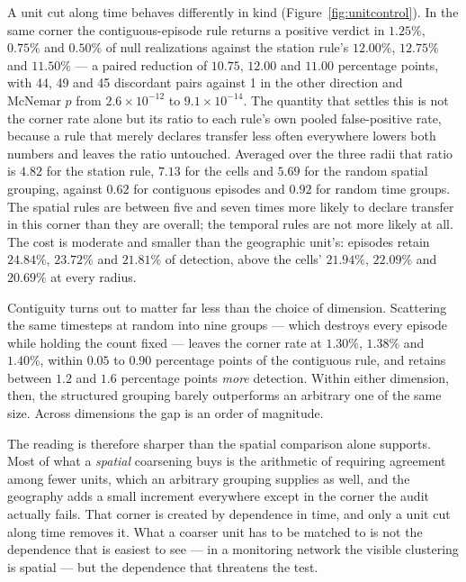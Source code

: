 A unit cut along time behaves differently in kind (Figure~\ref{fig:unitcontrol}). In the same
corner the contiguous-episode rule returns a positive verdict in $1.25\%$, $0.75\%$ and $0.50\%$ of
null realizations against the station rule's $12.00\%$, $12.75\%$ and $11.50\%$ --- a paired
reduction of $10.75$, $12.00$ and $11.00$ percentage points, with 44, 49 and 45 discordant pairs
against 1 in the other direction and McNemar $p$ from $2.6\times10^{-12}$ to $9.1\times10^{-14}$.
The quantity that settles this is not the corner rate alone but its ratio to each rule's own pooled
false-positive rate, because a rule that merely declares transfer less often everywhere lowers both
numbers and leaves the ratio untouched. Averaged over the three radii that ratio is $4.82$ for the
station rule, $7.13$ for the cells and $5.69$ for the random spatial grouping, against $0.62$ for
contiguous episodes and $0.92$ for random time groups. The spatial rules are between five and seven
times more likely to declare transfer in this corner than they are overall; the temporal rules are
not more likely at all. The cost is moderate and smaller than the geographic unit's: episodes
retain $24.84\%$, $23.72\%$ and $21.81\%$ of detection, above the cells' $21.94\%$, $22.09\%$ and
$20.69\%$ at every radius.

Contiguity turns out to matter far less than the choice of dimension. Scattering the same timesteps
at random into nine groups --- which destroys every episode while holding the count fixed --- leaves
the corner rate at $1.30\%$, $1.38\%$ and $1.40\%$, within $0.05$ to $0.90$ percentage points of the
contiguous rule, and retains between $1.2$ and $1.6$ percentage points \emph{more} detection. Within
either dimension, then, the structured grouping barely outperforms an arbitrary one of the same
size. Across dimensions the gap is an order of magnitude.

The reading is therefore sharper than the spatial comparison alone supports. Most of what a
\emph{spatial} coarsening buys is the arithmetic of requiring agreement among fewer units, which an
arbitrary grouping supplies as well, and the geography adds a small increment everywhere except in
the corner the audit actually fails. That corner is created by dependence in time, and only a unit
cut along time removes it. What a coarser unit has to be matched to is not the dependence that is
easiest to see --- in a monitoring network the visible clustering is spatial --- but the dependence
that threatens the test.



